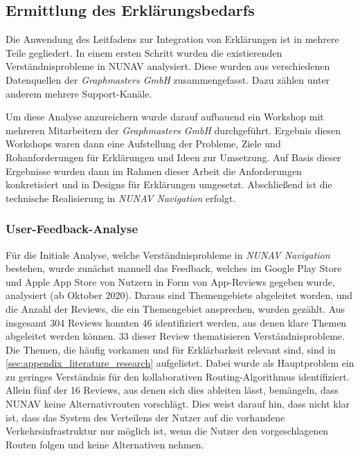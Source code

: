 \subsection{Ermittlung des Erklärungsbedarfs}
\label{sec:explanation_demand_generation}

Die Anwendung des Leitfadens zur Integration von Erklärungen ist in mehrere Teile gegliedert. In einem ersten Schritt wurden die existierenden Verständnisprobleme in NUNAV analysiert. Diese wurden aus verschiedenen Datenquellen der \textit{Graphmasters GmbH} zusammengefasst. Dazu zählen unter anderem mehrere Support-Kanäle.

Um diese Analyse anzureichern wurde darauf aufbauend ein Workshop mit mehreren Mitarbeitern der \textit{Graphmasters GmbH} durchgeführt. Ergebnis diesen Workshops waren dann eine Aufstellung der Probleme, Ziele und Rohanforderungen für Erklärungen und Ideen zur Umsetzung. Auf Basis dieser Ergebnisse wurden dann im Rahmen dieser Arbeit die Anforderungen konkretisiert und in Designs für Erklärungen umgesetzt. Abschließend ist die technische Realisierung in \textit{NUNAV Navigation} erfolgt.

\subsubsection{User-Feedback-Analyse}

Für die Initiale Analyse, welche Verständnisprobleme in \textit{NUNAV Navigation} bestehen, wurde zunächst manuell das Feedback, welches im Google Play Store und Apple App Store von Nutzern in Form von App-Reviews gegeben wurde, analysiert (ab Oktober 2020). Daraus sind Themengebiete abgeleitet worden, und die Anzahl der Reviews, die ein Themengebiet ansprechen, wurden gezählt. Aus insgesamt 304 Reviews konnten 46 identifiziert werden, aus denen klare Themen abgeleitet werden können. 33 dieser Review thematisieren Verständnisprobleme. Die Themen, die häufig vorkamen und für Erklärbarkeit relevant sind, sind in \autoref{sec:appendix_literature_research} aufgelistet. Dabei wurde als Hauptproblem ein zu geringes Verständnis für den kollaborativen Routing-Algorithmus identifiziert. Allein fünf der 16 Reviews, aus denen sich dies ableiten lässt, bemängeln, dass NUNAV keine Alternativrouten vorschlägt. Dies weist darauf hin, dass nicht klar ist, dass das System des Verteilens der Nutzer auf die vorhandene Verkehrsinfrastruktur nur möglich ist, wenn die Nutzer den vorgeschlagenen Routen folgen und keine Alternativen nehmen.

